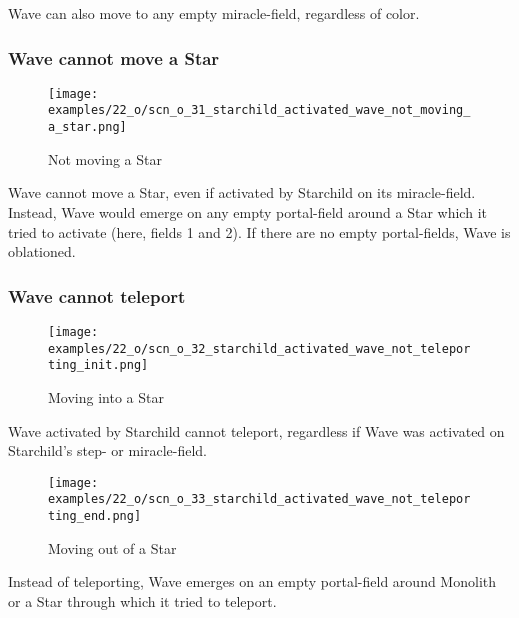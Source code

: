 Wave can also move to any empty miracle-field, regardless of color.

\subsubsection*{Wave cannot move a Star}
\label{sec:One/Starchild/Activating Wave/Wave cannot move a Star}

\noindent
\begin{wrapfigure}[9]{l}{0.4\textwidth}
\centering
\texttt{[image: examples/22\_o/scn\_o\_31\_starchild\_activated\_wave\_not\_moving\_a\_star.png]}
\caption{Not moving a Star}
\label{fig:scn_o_31_starchild_activated_wave_not_moving_a_star}
\end{wrapfigure}
Wave cannot move a Star, even if activated by Starchild on its miracle-field.
Instead, Wave would emerge on any empty portal-field around a Star which it tried
to activate (here, fields 1 and 2). If there are no empty portal-fields, Wave is
oblationed.

\clearpage %

\subsubsection*{Wave cannot teleport}
\label{sec:One/Starchild/Activating Wave/Wave cannot teleport}

\vspace*{-0.1\baselineskip}
\noindent
\begin{wrapfigure}[4]{l}{0.4\textwidth}
\centering
\texttt{[image: examples/22\_o/scn\_o\_32\_starchild\_activated\_wave\_not\_teleporting\_init.png]}
\vspace*{-0.4\baselineskip}
\caption{Moving into a Star}
\label{fig:scn_o_32_starchild_activated_wave_not_teleporting_init}
\end{wrapfigure}
Wave activated by Starchild cannot teleport, regardless if Wave was activated on
Starchild's step- or miracle-field.

\vspace*{5.7\baselineskip}
\noindent
\begin{wrapfigure}[7]{l}{0.4\textwidth}
\centering
\texttt{[image: examples/22\_o/scn\_o\_33\_starchild\_activated\_wave\_not\_teleporting\_end.png]}
\vspace*{-0.4\baselineskip}
\caption{Moving out of a Star}
\label{fig:scn_o_33_starchild_activated_wave_not_teleporting_end}
\end{wrapfigure}
Instead of teleporting, Wave emerges on an empty portal-field around Monolith or a
Star through which it tried to teleport.

